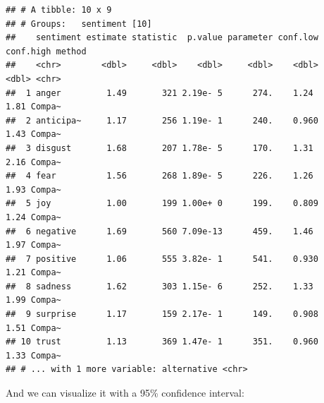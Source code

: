 \documentclass[
]{article}
\newenvironment{Shaded}{\begin{snugshade}}{\end{snugshade}}
\newcommand{\KeywordTok}[1]{\textcolor[rgb]{0.13,0.29,0.53}{\textbf{#1}}}
\newcommand{\NormalTok}[1]{#1}
\newcommand{\OperatorTok}[1]{\textcolor[rgb]{0.81,0.36,0.00}{\textbf{#1}}}
\newcommand{\StringTok}[1]{\textcolor[rgb]{0.31,0.60,0.02}{#1}}
\begin{document}
\begin{Shaded}
\end{Shaded}

\begin{verbatim}
## # A tibble: 10 x 9
## # Groups:   sentiment [10]
##    sentiment estimate statistic  p.value parameter conf.low conf.high method
##    <chr>        <dbl>     <dbl>    <dbl>     <dbl>    <dbl>     <dbl> <chr> 
##  1 anger         1.49       321 2.19e- 5      274.    1.24       1.81 Compa~
##  2 anticipa~     1.17       256 1.19e- 1      240.    0.960      1.43 Compa~
##  3 disgust       1.68       207 1.78e- 5      170.    1.31       2.16 Compa~
##  4 fear          1.56       268 1.89e- 5      226.    1.26       1.93 Compa~
##  5 joy           1.00       199 1.00e+ 0      199.    0.809      1.24 Compa~
##  6 negative      1.69       560 7.09e-13      459.    1.46       1.97 Compa~
##  7 positive      1.06       555 3.82e- 1      541.    0.930      1.21 Compa~
##  8 sadness       1.62       303 1.15e- 6      252.    1.33       1.99 Compa~
##  9 surprise      1.17       159 2.17e- 1      149.    0.908      1.51 Compa~
## 10 trust         1.13       369 1.47e- 1      351.    0.960      1.33 Compa~
## # ... with 1 more variable: alternative <chr>
\end{verbatim}

And we can visualize it with a 95\% confidence interval:
\end{document}

